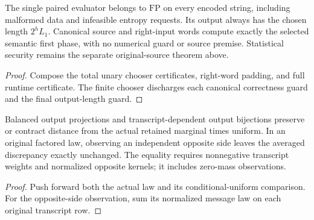 \begin{theorem}
  \label{thm:lowerbounds-algebraic-affine-phase-one-selected-program}
  \leanok
  The single paired evaluator belongs to $\mathrm{FP}$ on every
  encoded string, including malformed data and infeasible entropy
  requests. Its output always has the chosen length $2^hL_1$.
  Canonical source and right-input words compute exactly the selected
  semantic first phase, with no numerical guard or source premise.
  Statistical security remains the separate original-source theorem
  above.
\end{theorem}
\begin{proof}
  \leanok
  Compose the total unary chooser certificates, right-word padding,
  and full runtime certificate. The finite chooser discharges each
  canonical correctness guard and the final output-length guard.
\end{proof}

\begin{theorem}
  \label{thm:lowerbounds-algebraic-transcript-distance}
  \leanok
  Balanced output projections and transcript-dependent output bijections
  preserve or contract distance from the actual retained marginal times
  uniform. In an original factored law, observing an independent opposite
  side leaves the averaged discrepancy exactly unchanged. The equality
  requires nonnegative transcript weights and normalized opposite kernels;
  it includes zero-mass observations.
\end{theorem}
\begin{proof}
  \leanok
  Push forward both the actual law and its conditional-uniform comparison.
  For the opposite-side observation, sum its normalized message law on
  each original transcript row.
\end{proof}

